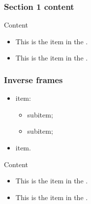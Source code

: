 \documentclass{beamerunicatt}
\begin{document}
\begin{frame}
\frametitle{Section 1 content}
\begin{block}{Content}
\begin{itemize}
\item This is the  item in the .
\item This is the  item in the .
\end{itemize}
\end{block}
\end{frame}

\begin{inverseframe}
\frametitle{Inverse frames}

\begin{itemize}
\item {} item:
\begin{itemize}
\normalsize
\item {} subitem;
\item {} subitem;
\end{itemize}
\item {}  item.
\end{itemize}

\begin{block}{Content}
\begin{itemize}
\item This is the  item in the .
\item This is the  item in the .
\end{itemize}
\end{block}
\end{inverseframe}
\end{document}

